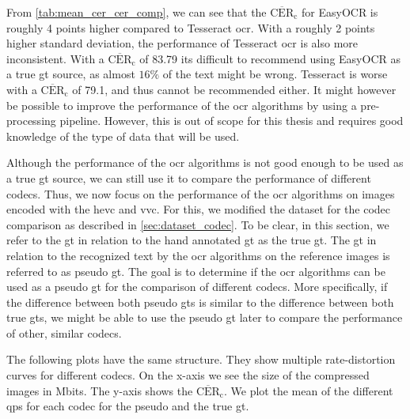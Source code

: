 From \autoref{tab:mean_cer_cer_comp}, we can see that the $\overline{\text{CER}}_{\text{c}}$ for EasyOCR is roughly 4 points higher compared to Tesseract \gls{ocr}.
With a roughly 2 points higher standard deviation, the performance of Tesseract \gls{ocr} is also more inconsistent.
With a $\overline{\text{CER}}_{\text{c}}$ of 83.79 its difficult to recommend using EasyOCR as a true \gls{gt} source, as almost $16\%$ of the text might be wrong.
Tesseract is worse with a $\overline{\text{CER}}_{\text{c}}$ of 79.1, and thus cannot be recommended either.
It might however be possible to improve the performance of the \gls{ocr} algorithms by using a pre-processing pipeline.
However, this is out of scope for this thesis and requires good knowledge of the type of data that will be used.



Although the performance of the \gls{ocr} algorithms is not good enough to be used as a true \gls{gt} source, we can still use it to compare the performance of different codecs.
Thus, we now focus on the performance of the \gls{ocr} algorithms on images encoded with the \gls{hevc} and \gls{vvc}.
For this, we modified the dataset for the codec comparison as described in \autoref{sec:dataset_codec}.
To be clear, in this section, we refer to the \gls{gt} in relation to the hand annotated \gls{gt} as the true \gls{gt}.
The \gls{gt} in relation to the recognized text by the \gls{ocr} algorithms on the reference images is referred to as pseudo \gls{gt}.
The goal is to determine if the \gls{ocr} algorithms can be used as a pseudo \gls{gt} for the comparison of different codecs.
More specifically, if the difference between both pseudo \glspl{gt} is similar to the difference between both true \glspl{gt}, we might be able to use the pseudo \gls{gt} later to compare the performance of other, similar codecs.

The following plots have the same structure.
They show multiple rate-distortion curves for different codecs.
On the x-axis we see the size of the compressed images in Mbits.
The y-axis shows the $\overline{\text{CER}}_{\text{c}}$.
We plot the mean of the different \glspl{qp} for each codec for the pseudo and the true \gls{gt}.


